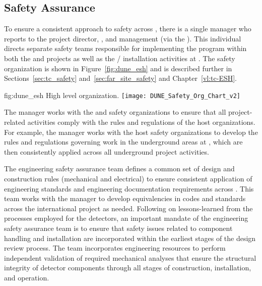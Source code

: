 \subsection{Safety Assurance}
\label{sec:dune_safety}

To ensure a consistent approach to safety across ,
there is a single   manager who reports 
to the  project director, , and 
management (via the  ).  This individual
directs separate safety teams responsible for implementing the
  program within both the  
and  projects as well as the /
installation activities at . The safety organization 
is shown in Figure~\ref{fig:dune_esh} and is described further in
Sections~\ref{sec:tc_safety} and~\ref{sec:far_site_safety} and
Chapter~\ref{vl:tc-ESH}.
\begin{dunefigure}{fig:dune_esh}
  {High level   organization.}
  \texttt{[image: DUNE\_Safety\_Org\_Chart\_v2]}
\end{dunefigure}
The   manager works with the  
and  safety organizations to ensure that all project-related 
activities comply with the rules and regulations of the host 
organizations.  For example, the   manager 
works with the host safety organizations to develop the rules and 
regulations governing work in the underground areas at , 
which are then consistently applied across all underground project 
activities.

The  engineering safety assurance team defines a common 
set of design and construction rules (mechanical and electrical) to 
ensure consistent application of engineering standards and engineering 
documentation requirements across .  This team works 
with the   manager to develop equivalencies 
in codes and standards across the international project as needed.  
Following on lessons-learned from the processes employed for the 
 detectors, an important mandate of the engineering 
safety assurance team is to ensure that safety issues related to 
component handling and installation are incorporated within the 
earliest stages of the design review process.  The  team 
incorporates engineering resources to perform independent validation 
of required mechanical analyses that ensure the structural integrity 
of detector components through all stages of construction, installation, 
and operation.


